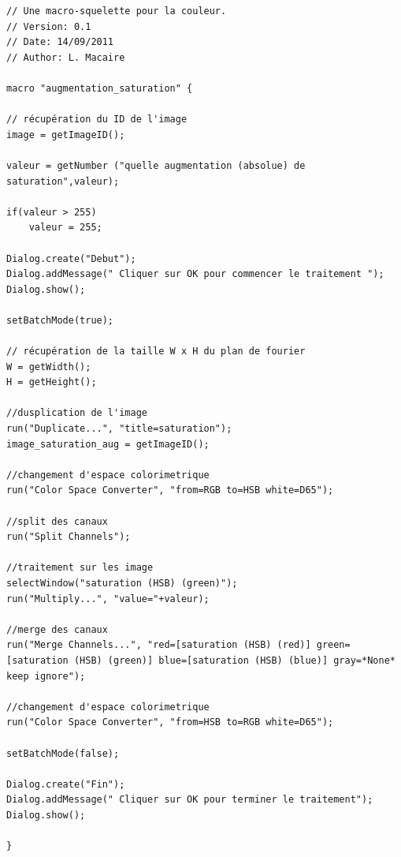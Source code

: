\documentclass[a4paper,10pt]{article}
\begin{document}
\begin{lstlisting}[caption=Macros de modification de la saturation d'une image]
// Une macro-squelette pour la couleur.
// Version: 0.1
// Date: 14/09/2011
// Author: L. Macaire
 
macro "augmentation_saturation" {

// récupération du ID de l'image
image = getImageID();

valeur = getNumber ("quelle augmentation (absolue) de saturation",valeur);

if(valeur > 255) 
    valeur = 255;

Dialog.create("Debut");
Dialog.addMessage(" Cliquer sur OK pour commencer le traitement ");
Dialog.show();

setBatchMode(true);

// récupération de la taille W x H du plan de fourier
W = getWidth();
H = getHeight();

//dusplication de l'image
run("Duplicate...", "title=saturation");
image_saturation_aug = getImageID();

//changement d'espace colorimetrique
run("Color Space Converter", "from=RGB to=HSB white=D65");

//split des canaux
run("Split Channels");

//traitement sur les image
selectWindow("saturation (HSB) (green)");
run("Multiply...", "value="+valeur);

//merge des canaux 
run("Merge Channels...", "red=[saturation (HSB) (red)] green=[saturation (HSB) (green)] blue=[saturation (HSB) (blue)] gray=*None* keep ignore");

//changement d'espace colorimetrique
run("Color Space Converter", "from=HSB to=RGB white=D65");

setBatchMode(false);

Dialog.create("Fin");
Dialog.addMessage(" Cliquer sur OK pour terminer le traitement");
Dialog.show();

}
\end{lstlisting}

\end{document}
